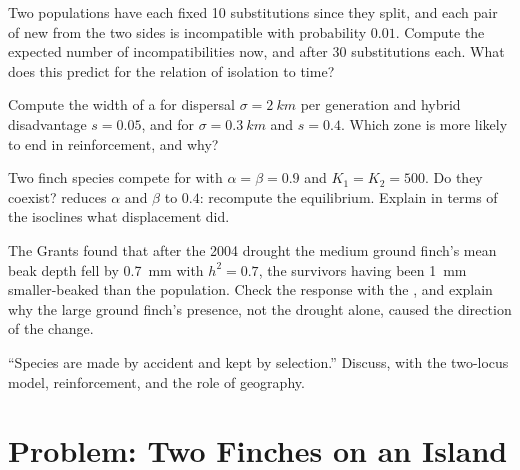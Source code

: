 \begin{exercise}[$\star\star$]\label{exo:b2:speciation:8}
Two populations have each fixed 10 substitutions since they split,
and each pair of new  from the two sides is incompatible
with probability $0.01$. Compute the expected number of
incompatibilities now, and after 30 substitutions each. What
does this predict for the relation of isolation to time?
\end{exercise}

\begin{exercise}[$\star\star$]\label{exo:b2:speciation:9}
Compute the width of a  for dispersal $\sigma =
\qty{2}{km}$ per generation and hybrid disadvantage $s = 0.05$, and
for $\sigma = \qty{0.3}{km}$ and $s = 0.4$. Which zone is more likely
to end in reinforcement, and why?
\end{exercise}

\begin{exercise}[$\star\star\star$]\label{exo:b2:speciation:10}
Two finch species compete for  with $\alpha = \beta = 0.9$ and
$K_1 = K_2 = 500$. Do they coexist?  reduces
$\alpha$ and $\beta$ to $0.4$: recompute the equilibrium. Explain in
terms of the isoclines what displacement did.
\end{exercise}

\begin{exercise}[$\star\star\star$]\label{exo:b2:speciation:11}
The Grants found that after the 2004 drought the medium ground
finch's mean beak depth fell by \qty{0.7}{mm} with $h^{2} = 0.7$,
the survivors having been \qty{1}{mm} smaller-beaked than the
population. Check the response with the , and
explain why the large ground finch's presence, not the drought
alone, caused the direction of the change.
\end{exercise}

\begin{exercise}[$\star\star\star$]\label{exo:b2:speciation:12}
``Species are made by accident and kept by selection.'' Discuss,
with the two-locus model, reinforcement, and the role of geography.
\end{exercise}

\section{Problem: Two Finches on an Island}

